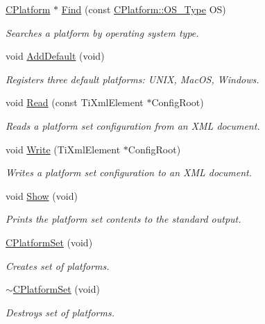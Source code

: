 \begin{DoxyCompactItemize}
\hyperlink{classCPlatform}{C\-Platform} $\ast$ \hyperlink{classCPlatformSet_abfcd0d9823ea261efe6d893952d10a1f}{Find} (const \hyperlink{classCPlatform_a2fb735c63c53052f79629e338bb0f535}{C\-Platform\-::\-O\-S\-\_\-\-Type} O\-S)
\begin{DoxyCompactList}\small\item\em Searches a platform by operating system type. \end{DoxyCompactList}\item 
void \hyperlink{classCPlatformSet_a8c4130e3585d6d915b916b6572708714}{Add\-Default} (void)
\begin{DoxyCompactList}\small\item\em Registers three default platforms\-: U\-N\-I\-X, Mac\-O\-S, Windows. \end{DoxyCompactList}\item 
void \hyperlink{classCPlatformSet_a8c96bb82230c3e2288055ca4852ec63e}{Read} (const Ti\-Xml\-Element $\ast$Config\-Root)
\begin{DoxyCompactList}\small\item\em Reads a platform set configuration from an X\-M\-L document. \end{DoxyCompactList}\item 
void \hyperlink{classCPlatformSet_a21dcc5bd75c8511e38efdbf26720fa98}{Write} (Ti\-Xml\-Element $\ast$Config\-Root)
\begin{DoxyCompactList}\small\item\em Writes a platform set configuration to an X\-M\-L document. \end{DoxyCompactList}\item 
void \hyperlink{classCPlatformSet_af0d48ec8098208ff9be0ccbabe5719e5}{Show} (void)
\begin{DoxyCompactList}\small\item\em Prints the platform set contents to the standard output. \end{DoxyCompactList}\item 
\hyperlink{classCPlatformSet_ac19c70e976f424776f7c94f16e4c9232}{C\-Platform\-Set} (void)
\begin{DoxyCompactList}\small\item\em Creates set of platforms. \end{DoxyCompactList}\item 
\hyperlink{classCPlatformSet_abc02ebfb1f0c772091a12e9fefdcf6fd}{$\sim$\-C\-Platform\-Set} (void)
\begin{DoxyCompactList}\small\item\em Destroys set of platforms. \end{DoxyCompactList}\end{DoxyCompactItemize}
